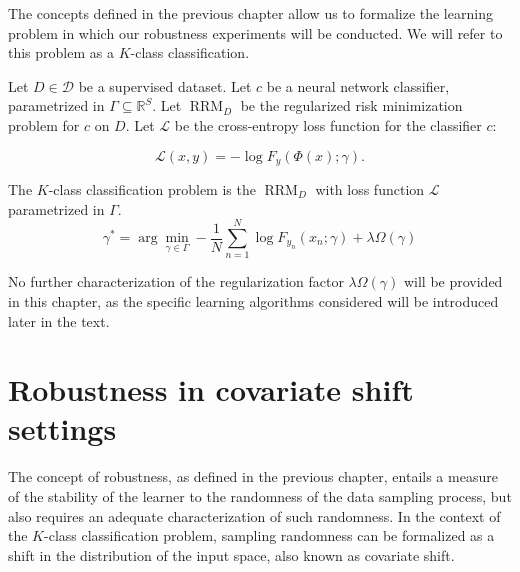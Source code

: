 The concepts defined in the previous chapter allow us to 
formalize the learning problem in which our robustness experiments
will be conducted. We will refer to this problem as a 
$K$-class classification.

\begin{definition}
    Let $D \in \mathcal{D}$ be a supervised dataset.
    Let $c$ be a neural network classifier, parametrized
    in $\Gamma \subseteq \mathbb{R}^{S}$.
    Let $\operatorname{RRM}_D$ be the regularized risk minimization problem for $c$ on $D$.
    Let $\mathcal{L}$ be the cross-entropy loss function for the classifier $c$:

    $$
    \mathcal{L}(x, y) = - \log F_y(\Phi(x); \gamma).
    $$

    The $K$-class classification problem is the $\operatorname{RRM}_D$ 
    with loss function $\mathcal{L}$ parametrized in $\Gamma$. 
    $$
        \gamma^* = \arg \min_{\gamma \in \Gamma} - \frac{1}{N}\sum_{n=1}^{N} \log F_{y_n}(x_n; \gamma) + \lambda \Omega(\gamma)
    $$

\end{definition}

No further characterization of the regularization factor $\lambda \Omega(\gamma)$ will be provided
in this chapter, as the specific learning algorithms considered will be introduced
later in the text.

\section{Robustness in covariate shift settings}\label{sec:robustness_to_covariate_shift}

The concept of robustness, as defined in the previous chapter, entails
a measure of the stability of the learner to the randomness of
the data sampling process, but also requires an adequate characterization
of such randomness. In the context of the $K$-class classification
problem, sampling randomness can be formalized as a shift in the
distribution of the input space, also known as covariate shift. 


